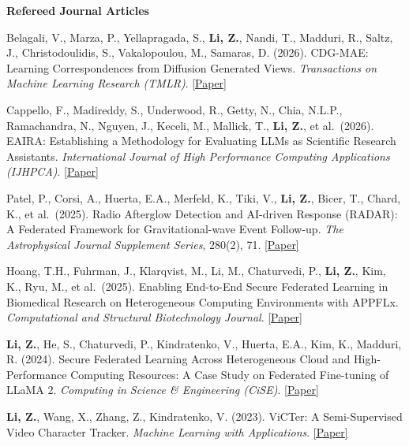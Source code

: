 \documentclass[letterpaper,11pt]{article}
\newcommand{\PubSection}[1]{%
  \vspace{6pt}\noindent\textbf{#1}\vspace{3pt}%
}
\begin{document}
\PubSection{Refereed Journal Articles}
\begin{enumerate}[leftmargin=1cm, label={[\arabic*]}, itemsep=3pt]
  \small
    \item Belagali, V., Marza, P., Yellapragada, S., \textbf{Li, Z.}, Nandi, T., Madduri, R., Saltz, J., Christodoulidis, S., Vakalopoulou, M., Samaras, D. (2026). CDG-MAE: Learning Correspondences from Diffusion Generated Views. \textit{Transactions on Machine Learning Research (TMLR)}. \href{https://openreview.net/pdf?id=7XIymKIA0v}{[Paper]}

    \item Cappello, F., Madireddy, S., Underwood, R., Getty, N., Chia, N.L.P., Ramachandra, N., Nguyen, J., Keceli, M., Mallick, T., \textbf{Li, Z.}, et al.\ (2026). EAIRA: Establishing a Methodology for Evaluating LLMs as Scientific Research Assistants. \textit{International Journal of High Performance Computing Applications (IJHPCA)}. \href{https://journals.sagepub.com/doi/pdf/10.1177/10943420261467786}{[Paper]}

    \item Patel, P., Corsi, A., Huerta, E.A., Merfeld, K., Tiki, V., \textbf{Li, Z.}, Bicer, T., Chard, K., et al.\ (2025). Radio Afterglow Detection and AI-driven Response (RADAR): A Federated Framework for Gravitational-wave Event Follow-up. \textit{The Astrophysical Journal Supplement Series}, 280(2), 71. \href{https://doi.org/10.3847/1538-4365/adfbea}{[Paper]}

  
  \item Hoang, T.H., Fuhrman, J., Klarqvist, M., Li, M., Chaturvedi, P., \textbf{Li, Z.}, Kim, K., Ryu, M., et al.\ (2025). Enabling End-to-End Secure Federated Learning in Biomedical Research on Heterogeneous Computing Environments with APPFLx. \textit{Computational and Structural Biotechnology Journal}. \href{https://arxiv.org/abs/2312.08701}{[Paper]}

  \item \textbf{Li, Z.}, He, S., Chaturvedi, P., Kindratenko, V., Huerta, E.A., Kim, K., Madduri, R. (2024). Secure Federated Learning Across Heterogeneous Cloud and High-Performance Computing Resources: A Case Study on Federated Fine-tuning of LLaMA 2. \textit{Computing in Science \& Engineering (CiSE)}. \href{https://arxiv.org/abs/2402.12271}{[Paper]}

  \item \textbf{Li, Z.}, Wang, X., Zhang, Z., Kindratenko, V. (2023). ViCTer: A Semi-Supervised Video Character Tracker. \textit{Machine Learning with Applications}. \href{https://doi.org/10.1016/j.mlwa.2023.100460}{[Paper]}
\end{enumerate}
\end{document}
